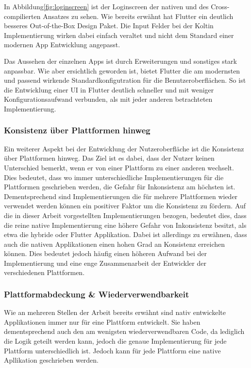 In Abbildung\ref{fig:loginscreen} ist der Loginscreen der nativen und des Cross-compilierten Ansatzes zu sehen. Wie bereits erwähnt hat Flutter ein deutlich besseres Out-of-the-Box Design Paket. Die Input Felder bei der Koltin Implementierung wirken dabei einfach veraltet und nicht dem Standard einer modernen App Entwicklung angepasst.

Das Aussehen der einzelnen Apps ist durch Erweiterungen und sonstiges stark anpassbar. Wie aber ersichtlich geworden ist, bietet Flutter die am modernsten und passend wirkende Standardkonfigutration für die Benutzeroberflächen. So ist die Entwicklung einer \ac{UI} in Flutter deutlich schneller und mit weniger Konfigurationsaufwand verbunden, als mit jeder anderen betrachteten Implementierung.

\subsubsection{Konsistenz über Plattformen hinweg}
Ein weiterer Aspekt bei der Entwicklung der Nutzeroberfläche ist die Konsistenz über Plattformen hinweg. Das Ziel ist es dabei, dass der Nutzer keinen Unterschied bemerkt, wenn er von einer Plattform zu einer anderen wechselt. 
Dies bedeutet, dass wo immer unterschiedliche Implementierungen für die Plattformen geschrieben werden, die Gefahr für Inkonsistenz am höchsten ist.
Dementsprechend sind Implementierungen die für mehrere Plattformen wieder verwendet werden können ein positiver Faktor um die Konsistenz zu fördern.
Auf die in dieser Arbeit vorgestellten Implementierungen bezogen, bedeutet dies, dass die reine native Implementierung eine höhere Gefahr von Inkonsistenz besitzt, als etwa die hybride oder Flutter Applikation.
Dabei ist allerdings zu erwähnen, dass auch die nativen Applikationen einen hohen Grad an Konsistenz erreichen können. Dies bedeutet jedoch häufig einen höheren Aufwand bei der Implementierung und eine enge Zusammenarbeit der Entwickler der verschiedenen Plattformen.

\subsubsection{Plattformabdeckung \& Wiederverwendbarkeit}
Wie an mehreren Stellen der Arbeit bereits erwähnt sind nativ entwickelte Applikationen immer nur für eine Plattform entwickelt. Sie haben dementsprechend auch den am wenigsten wiederverwendbaren Code, da lediglich die Logik geteilt werden kann, jedoch die genaue Implementierung für jede Plattform unterschiedlich ist. Jedoch kann für jede Plattform eine native Apllikation geschrieben werden.

